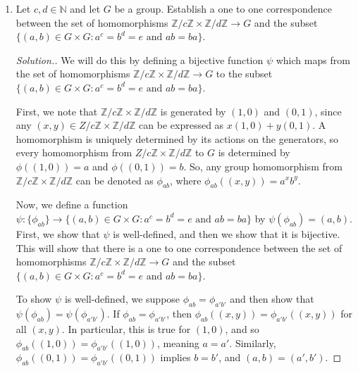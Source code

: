 \documentclass{article}
\newcommand{\sk}{\smallskip}
\newcommand{\Z}{\mathbb{Z}}
\newcommand{\N}{\mathbb{N}}
\begin{document}
\begin{enumerate}
\begin{enumerate}
\begin{proof}[Solution.]
        \end{proof}

        \item (For fun, not graded) How many subgroups of order $p^r$ are there?
        \begin{proof}[Solution.]
            $\frac{(p^n - 1)(p^n - p)(p^n - p^2)\dots(p^n - p^{r-1})}{(p^r - 1)(p^r - p)(p^r - p^2)\dots(p^r - p^{r-1})}$
        \end{proof}

        
    \end{enumerate}


    \item Let $c, d \in \N$ and let $G$ be a group. Establish a one to one correspondence between the set of homomorphisms $\Z/c\Z \times \Z/d\Z \rightarrow G$ and the subset $\{(a, b) \in G \times G : a^c = b^d = e \text{ and } ab = ba\}$.

    \begin{proof}[Solution.]
        We will do this by defining a bijective function $\psi$ which maps from the set of homomorphisms $\Z/c\Z \times \Z/d\Z \rightarrow G$ to the subset $\{(a, b) \in G \times G : a^c = b^d = e \text{ and } ab = ba\}$.

        \sk

        First, we note that $\Z/c\Z \times \Z/d\Z$ is generated by $(1, 0)$ and $(0, 1)$, since any $(x, y) \in Z/c\Z \times \Z/d\Z$ can be expressed as $x(1, 0) + y(0, 1)$. A homomorphism is uniquely determined by its actions on the generators, so every homomorphism from $Z/c\Z \times \Z/d\Z$ to $G$ is determined by $\phi((1, 0)) = a$ and $\phi((0, 1)) = b$. So, any group homomorphism from $\Z/c\Z \times \Z/d\Z$ can be denoted as $\phi_{ab}$, where $\phi_{ab}((x, y)) = a^xb^y$. 

        \sk

        Now, we define a function $\psi: \{\phi_{ab}\} \rightarrow \{(a, b) \in G \times G : a^c = b^d = e \text{ and } ab = ba\}$ by $\psi(\phi_{ab}) = (a, b)$. First, we show that $\psi$ is well-defined, and then we show that it is bijective. This will show that there is a one to one correspondence between the set of homomorphisms $\Z/c\Z \times \Z/d\Z \rightarrow G$ and the subset $\{(a, b) \in G \times G : a^c = b^d = e \text{ and } ab = ba\}$.

        \sk

        To show $\psi$ is well-defined, we suppose $\phi_{ab} = \phi_{a'b'}$ and then show that $\psi(\phi_{ab}) = \psi(\phi_{a'b'})$. If $\phi_{ab} = \phi_{a'b'}$, then $\phi_{ab}((x, y)) = \phi_{a'b'}((x, y))$ for all $(x, y)$. In particular, this is true for $(1, 0)$, and so $\phi_{ab}((1,0)) = \phi_{a'b'}((1, 0))$, meaning $a = a'$. Similarly, $\phi_{ab}((0, 1)) = \phi_{a'b'}((0, 1))$ implies $b = b'$, and $(a, b) = (a', b')$. 
        

\end{proof}
\end{enumerate}
\end{document}
